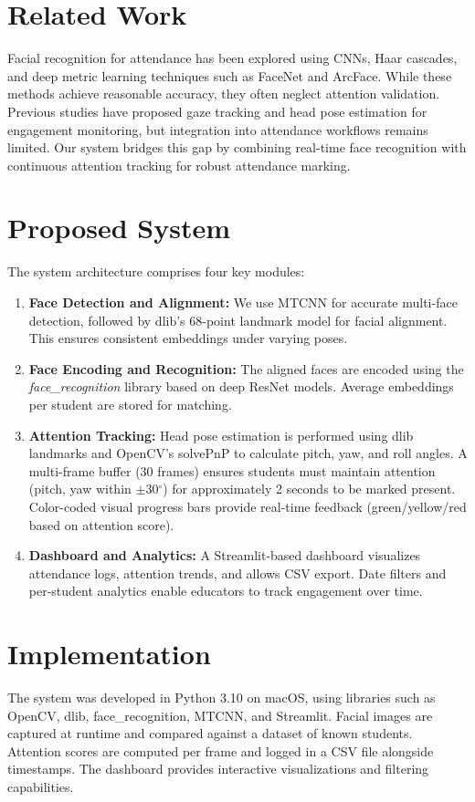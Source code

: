 \documentclass[conference]{IEEEtran}
\begin{document}
\section{Related Work}
Facial recognition for attendance has been explored using CNNs, Haar cascades, and deep metric learning techniques such as FaceNet and ArcFace. While these methods achieve reasonable accuracy, they often neglect attention validation. Previous studies have proposed gaze tracking and head pose estimation for engagement monitoring, but integration into attendance workflows remains limited. Our system bridges this gap by combining real-time face recognition with continuous attention tracking for robust attendance marking.

\section{Proposed System}
The system architecture comprises four key modules:
\begin{enumerate}
    \item \textbf{Face Detection and Alignment:} We use MTCNN for accurate multi-face detection, followed by dlib's 68-point landmark model for facial alignment. This ensures consistent embeddings under varying poses.
    \item \textbf{Face Encoding and Recognition:} The aligned faces are encoded using the \textit{face\_recognition} library based on deep ResNet models. Average embeddings per student are stored for matching.
    \item \textbf{Attention Tracking:} Head pose estimation is performed using dlib landmarks and OpenCV's solvePnP to calculate pitch, yaw, and roll angles. A multi-frame buffer (30 frames) ensures students must maintain attention (pitch, yaw within $\pm$30$^\circ$) for approximately 2 seconds to be marked present. Color-coded visual progress bars provide real-time feedback (green/yellow/red based on attention score).
    \item \textbf{Dashboard and Analytics:} A Streamlit-based dashboard visualizes attendance logs, attention trends, and allows CSV export. Date filters and per-student analytics enable educators to track engagement over time.
\end{enumerate}

\section{Implementation}
The system was developed in Python 3.10 on macOS, using libraries such as OpenCV, dlib, face\_recognition, MTCNN, and Streamlit. Facial images are captured at runtime and compared against a dataset of known students. Attention scores are computed per frame and logged in a CSV file alongside timestamps. The dashboard provides interactive visualizations and filtering capabilities.
\end{document}
